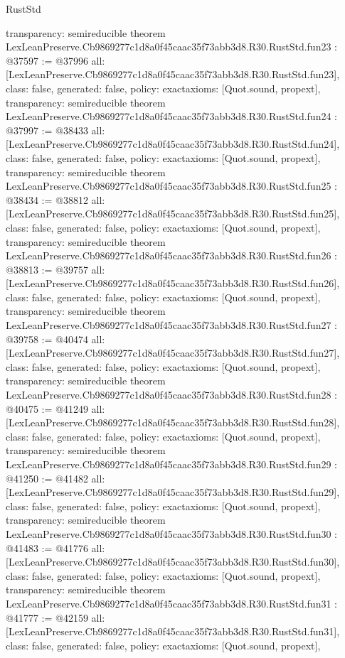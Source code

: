 \begin{lexlean}{RustStd}
\begin{coremodule}
{  transparency: semireducible
}
theorem LexLeanPreserve.Cb9869277c1d8a0f45caac35f73abb3d8.R30.RustStd.fun23 : @37597 := @37996 {
  all: [LexLeanPreserve.Cb9869277c1d8a0f45caac35f73abb3d8.R30.RustStd.fun23],
  class: false,
  generated: false,
  policy: exact{axioms: [Quot.sound, propext]},
  transparency: semireducible
}
theorem LexLeanPreserve.Cb9869277c1d8a0f45caac35f73abb3d8.R30.RustStd.fun24 : @37997 := @38433 {
  all: [LexLeanPreserve.Cb9869277c1d8a0f45caac35f73abb3d8.R30.RustStd.fun24],
  class: false,
  generated: false,
  policy: exact{axioms: [Quot.sound, propext]},
  transparency: semireducible
}
theorem LexLeanPreserve.Cb9869277c1d8a0f45caac35f73abb3d8.R30.RustStd.fun25 : @38434 := @38812 {
  all: [LexLeanPreserve.Cb9869277c1d8a0f45caac35f73abb3d8.R30.RustStd.fun25],
  class: false,
  generated: false,
  policy: exact{axioms: [Quot.sound, propext]},
  transparency: semireducible
}
theorem LexLeanPreserve.Cb9869277c1d8a0f45caac35f73abb3d8.R30.RustStd.fun26 : @38813 := @39757 {
  all: [LexLeanPreserve.Cb9869277c1d8a0f45caac35f73abb3d8.R30.RustStd.fun26],
  class: false,
  generated: false,
  policy: exact{axioms: [Quot.sound, propext]},
  transparency: semireducible
}
theorem LexLeanPreserve.Cb9869277c1d8a0f45caac35f73abb3d8.R30.RustStd.fun27 : @39758 := @40474 {
  all: [LexLeanPreserve.Cb9869277c1d8a0f45caac35f73abb3d8.R30.RustStd.fun27],
  class: false,
  generated: false,
  policy: exact{axioms: [Quot.sound, propext]},
  transparency: semireducible
}
theorem LexLeanPreserve.Cb9869277c1d8a0f45caac35f73abb3d8.R30.RustStd.fun28 : @40475 := @41249 {
  all: [LexLeanPreserve.Cb9869277c1d8a0f45caac35f73abb3d8.R30.RustStd.fun28],
  class: false,
  generated: false,
  policy: exact{axioms: [Quot.sound, propext]},
  transparency: semireducible
}
theorem LexLeanPreserve.Cb9869277c1d8a0f45caac35f73abb3d8.R30.RustStd.fun29 : @41250 := @41482 {
  all: [LexLeanPreserve.Cb9869277c1d8a0f45caac35f73abb3d8.R30.RustStd.fun29],
  class: false,
  generated: false,
  policy: exact{axioms: [Quot.sound, propext]},
  transparency: semireducible
}
theorem LexLeanPreserve.Cb9869277c1d8a0f45caac35f73abb3d8.R30.RustStd.fun30 : @41483 := @41776 {
  all: [LexLeanPreserve.Cb9869277c1d8a0f45caac35f73abb3d8.R30.RustStd.fun30],
  class: false,
  generated: false,
  policy: exact{axioms: [Quot.sound, propext]},
  transparency: semireducible
}
theorem LexLeanPreserve.Cb9869277c1d8a0f45caac35f73abb3d8.R30.RustStd.fun31 : @41777 := @42159 {
  all: [LexLeanPreserve.Cb9869277c1d8a0f45caac35f73abb3d8.R30.RustStd.fun31],
  class: false,
  generated: false,
  policy: exact{axioms: [Quot.sound, propext]},
}
\end{coremodule}
\end{lexlean}
